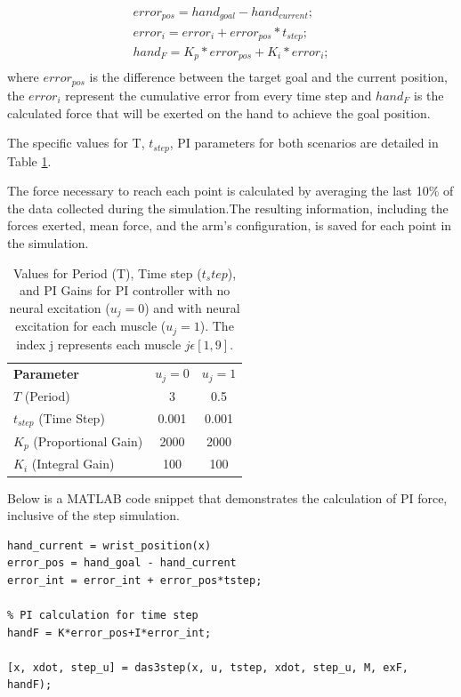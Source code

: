 \begin{equation} \label{eq:PID}
\begin{aligned}
        error_{pos} = hand_{goal} - hand_{current}; \\
        error_{i} = error_i + error_{pos}*t_{step}; \\
        hand_F = K_p*error_{pos} + K_i*error_i; \\
\end{aligned}
\end{equation}
where $error_{pos}$ is the difference between the target goal and the current position, the $error_i$ represent the cumulative error from every time step and $hand_F$ is the calculated force that will be exerted on the hand to achieve the goal position.

The specific values for T, $t_{step}$, PI parameters for both scenarios are detailed in Table \ref{tab:PI}.

The force necessary to reach each point is calculated by averaging the last 10\% of the data collected during the simulation.The resulting information, including the forces exerted, mean force, and the arm's configuration, is  saved for each point in the simulation.

\begin{table}[h]
    \centering
    \caption{Values for Period (T), Time step ($t_step$), and PI Gains for PI controller with no neural excitation ($u_j=0$) and with neural excitation for each muscle ($u_j = 1$). The index j represents each muscle $j \epsilon[1,9]$.}
    \begin{tabular}{|l|c|c|}
        \hline
        \textbf{Parameter} & \textbf{$u_j=0$} & \textbf{$u_j=1$} \\
        \(T\) (Period) & 3 & 0.5 \\
        \(t_{step}\) (Time Step) & 0.001 & 0.001 \\
        \( K_p \) (Proportional Gain) & 2000 & 2000\\
        \( K_i \) (Integral Gain)     & 100 & 100 \\
        \hline
    \end{tabular}

    \label{tab:PI}
\end{table}

Below is a MATLAB code snippet that demonstrates the calculation of PI force, inclusive of the step simulation.

\begin{lstlisting}[style=Matlab-editor]
hand_current = wrist_position(x)
error_pos = hand_goal - hand_current
error_int = error_int + error_pos*tstep;

% PI calculation for time step
handF = K*error_pos+I*error_int;

[x, xdot, step_u] = das3step(x, u, tstep, xdot, step_u, M, exF, handF);
\end{lstlisting}

